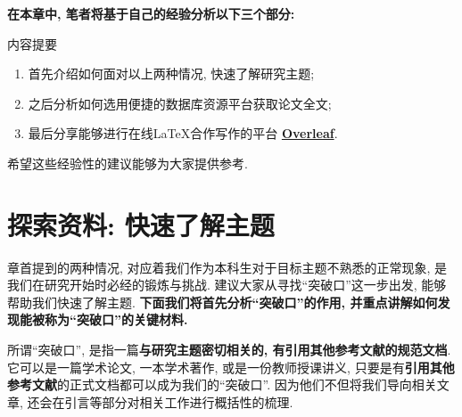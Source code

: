 \documentclass{booki}
\begin{document}
\textbf{在本章中, 笔者将基于自己的经验分析以下三个部分:}
\begin{titledBox}{内容提要}
\begin{enumerate}
    \item 首先介绍如何面对以上两种情况, 快速了解研究主题;
    \item 之后分析如何{选用便捷的}数据库资源平台获取论文全文;
    \item 最后分享能够进行在线\LaTeX 合作写作的平台 \textbf{\href{https://www.overleaf.com/}{Overleaf}}.
\end{enumerate}
\end{titledBox}
希望这些经验性的建议能够为大家提供参考.

\section{探索资料: 快速了解主题}
章首提到的两种情况, 对应着我们作为本科生对于目标主题不熟悉的正常现象, 是我们在研究开始时必经的锻炼与挑战. 建议大家从寻找``突破口''这一步出发, 能够帮助我们快速了解主题. {\textbf{下面我们将首先分析``突破口''的作用, 并重点讲解如何发现能被称为``突破口''的关键材料.}}

所谓``突破口'', 是指一篇\textbf{与研究主题密切相关的, 有引用其他参考文献的规范文档}. 它可以是一篇学术论文, 一本学术著作, 或是一份教师授课讲义, 只要是有\textbf{引用其他参考文献}的正式文档都可以成为我们的``突破口''. 因为他们不但将我们导向相关文章, 还会在引言等部分对相关工作进行概括性的梳理.
\end{document}

